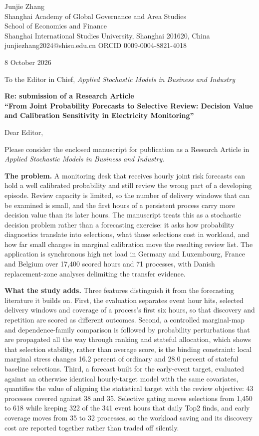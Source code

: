 \documentclass[10pt,a4paper]{article}
\begin{document}
\begin{flushright}
Junjie Zhang\\
Shanghai Academy of Global Governance and Area Studies\\
School of Economics and Finance\\
Shanghai International Studies University, Shanghai 201620, China\\
junjiezhang2024@shisu.edu.cn \quad ORCID 0009-0004-8821-4018
\end{flushright}

8 October 2026

To the Editor in Chief, \emph{Applied Stochastic Models in Business and Industry}

\textbf{Re: submission of a Research Article}\\
\textbf{``From Joint Probability Forecasts to Selective Review: Decision Value and Calibration Sensitivity in Electricity Monitoring''}

Dear Editor,

Please consider the enclosed manuscript for publication as a Research Article in \emph{Applied Stochastic Models in Business and Industry}.

\textbf{The problem.} A monitoring desk that receives hourly joint risk forecasts can hold a well calibrated probability and still review the wrong part of a developing episode. Review capacity is limited, so the number of delivery windows that can be examined is small, and the first hours of a persistent process carry more decision value than its later hours. The manuscript treats this as a stochastic decision problem rather than a forecasting exercise: it asks how probability diagnostics translate into selections, what those selections cost in workload, and how far small changes in marginal calibration move the resulting review list. The application is synchronous high net load in Germany and Luxembourg, France and Belgium over 17,400 scored hours and 71 processes, with Danish replacement-zone analyses delimiting the transfer evidence.

\textbf{What the study adds.} Three features distinguish it from the forecasting literature it builds on. First, the evaluation separates event hour hits, selected delivery windows and coverage of a process's first six hours, so that discovery and repetition are scored as different outcomes. Second, a controlled marginal-map and dependence-family comparison is followed by probability perturbations that are propagated all the way through ranking and stateful allocation, which shows that selection stability, rather than average score, is the binding constraint: local marginal stress changes 16.2 percent of ordinary and 28.0 percent of stateful baseline selections. Third, a forecast built for the early-event target, evaluated against an otherwise identical hourly-target model with the same covariates, quantifies the value of aligning the statistical target with the review objective: 43 processes covered against 38 and 35. Selective gating moves selections from 1,450 to 618 while keeping 322 of the 341 event hours that daily Top2 finds, and early coverage moves from 35 to 32 processes, so the workload saving and its discovery cost are reported together rather than traded off silently.
\end{document}
